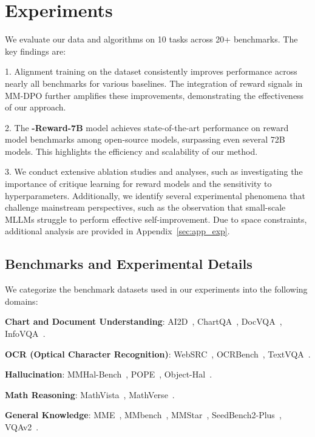\section{Experiments}

We evaluate our data and algorithms on 10 tasks across 20+ benchmarks. The key findings are:


1. Alignment training on the \textbf{\abbr} dataset consistently improves performance across nearly all benchmarks for various baselines. The integration of reward signals in MM-DPO further amplifies these improvements, demonstrating the effectiveness of our approach.



2. The \textbf{\abbr-Reward-7B} model achieves state-of-the-art performance on reward model benchmarks among open-source models, surpassing even several 72B models. This highlights the efficiency and scalability of our method.

3. We conduct extensive ablation studies and analyses, such as investigating the importance of critique learning for reward models and the sensitivity to hyperparameters. Additionally, we identify several experimental phenomena that challenge mainstream perspectives, such as the observation that small-scale MLLMs struggle to perform effective self-improvement. Due to space constraints, additional analysis are provided in Appendix~\ref{sec:app_exp}.


\subsection{Benchmarks and Experimental Details}

We categorize the benchmark datasets used in our experiments into the following domains:

\textbf{Chart and Document Understanding}:
AI2D~\cite{kembhavi2016diagram}, ChartQA~\cite{chartqa}, DocVQA~\cite{docvqa}, InfoVQA~\cite{mathew2022infographicvqa}.

\textbf{OCR (Optical Character Recognition)}:
WebSRC~\cite{chen2021websrc}, OCRBench~\cite{liu2024hidden}, TextVQA~\cite{singh2019towards}.

\textbf{Hallucination}:
MMHal-Bench~\cite{mmhal-bench}, POPE~\cite{pope}, Object-Hal~\cite{li2023evaluating}.

\textbf{Math Reasoning}:
MathVista~\cite{lu2024mathvista}, MathVerse~\cite{zhang2024mathverse}.

\textbf{General Knowledge}:
MME~\cite{fu2023mme}, MMbench~\cite{liu2023mmbench}, MMStar~\cite{chen2024we}, SeedBench2-Plus~\cite{li2024seed}, VQAv2~\cite{antol2015vqa}.

